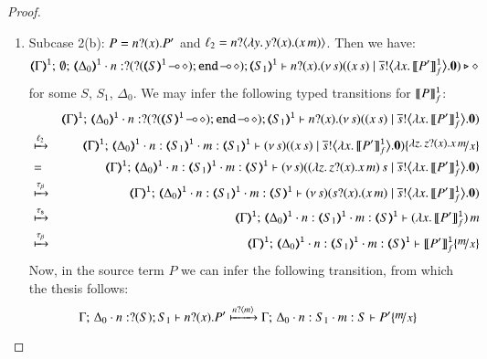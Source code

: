 \begin{proof}
\begin{enumerate}[1.]
	\item	Subcase 2(b): $P = n ? (x) . P'$ and $\ell_2 = n ? \langle \lambda y.\,y ? (x) . (x\, {m}) \rangle$.
		Then we have:
%
		\[
			\tmap{\Gamma}{1};\, \emptyset;\, \tmap{\Delta_0}{1} \cat 
			n: \btinp{\lhot{\btinp{\lhot{\tmap{S}{1}}}\tinact}} \tmap{S_1}{1}
			\proves
			\binp{n}{x} \newsp{s}{(\appl{x}{s})
			\Par 
			\bbout{\dual{s}}{\abs{x}{\pmapp{P'}{1}{f}}} \inact}
			\hastype \Proc
		\]
%
		for some $S$, $S_1$, $\Delta_0$.
		We may infer the following typed transitions for $\llbracket P\rrbracket^\mathtt{1}_f$:
%
		\begin{eqnarray*}
			& & 
			\tmap{\Gamma}{1};\, %
			\tmap{\Delta_0}{1} \cat 
			n: \btinp{\lhot{\btinp{\lhot{\tmap{S}{1}}}\tinact}} \tmap{S_1}{1}
			\proves
			\binp{n}{x} \newsp{s}{(\appl{x}{s}) 
							\Par 
							\bbout{\dual{s}}{\abs{x}{\pmapp{P'}{1}{f}}} \inact} \\
			& \hby{\ell_2} & 
			\tmap{\Gamma}{1};\, %
			\tmap{\Delta_0}{1} \cat 
			n:\tmap{S_1}{1}
			\cat m:\tmap{S_1}{1}
			\proves
			\newsp{s}{(\appl{x}{s}) 
				\Par 
				\bbout{\dual{s}}{\abs{x}{\pmapp{P'}{1}{f}}} \inact} \subst{\abs{z}\binp{z}{x}\appl{x}{m}}{x} \\
			& = & 
			\tmap{\Gamma}{1};\, %
			\tmap{\Delta_0}{1} 
			\cat n:\tmap{S_1}{1}
			\cat m:\tmap{S}{1}
			\proves
			\newsp{s}{\appl{(\abs{z}\binp{z}{x}\appl{x}{m})}{s}
				\Par 
				\bbout{\dual{s}}{\abs{x}{\pmapp{P'}{1}{f}}} \inact}  
				\\
			& \hby{\btau} & 
			\tmap{\Gamma}{1};\, %
			\tmap{\Delta_0}{1} 
			\cat n:\tmap{S_1}{1}
			\cat m:\tmap{S}{1}
			\proves
			\newsp{s}{\binp{s}{x}(\appl{x}{m}) 
				\Par 
				\bbout{\dual{s}}{\abs{x}{\pmapp{P'}{1}{f}}} \inact}  
				\\
			& \hby{\stau} & 
			\tmap{\Gamma}{1};\, %
			\tmap{\Delta_0}{1} 
			\cat n:\tmap{S_1}{1}
			\cat m:\tmap{S}{1}
			\proves
			\appl{(\abs{x}{\pmapp{P'}{1}{f}})}{m}   \\
			& \hby{\btau} & 
			\tmap{\Gamma}{1};\, %
			\tmap{\Delta_0}{1} 
			\cat n:\tmap{S_1}{1}
			\cat m:\tmap{S}{1}
			\proves
			\pmapp{P'}{1}{f}\subst{m}{x}   
		\end{eqnarray*}
%
		Now, in the source term $P$ we can infer the following transition, from which the thesis follows:
%
		\[
			\Gamma;\,  \Delta_0 \cat n:\btinp{S} S_1 \proves \binp{n}{x} P'
			\hby{\bactinp{n}{m}} 
			\Gamma;\,  \Delta_0 \cat n: S_1 \cat m: S \proves P'\subst{m}{x}
		\]
\end{enumerate}
\end{proof}


